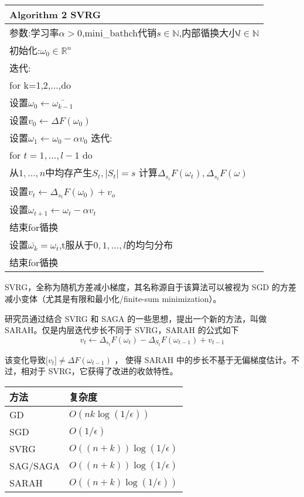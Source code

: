 \documentclass{book}
\begin{document}
\begin{tabular}{l}
	\hline
	Algorithm 2 SVRG\\
	\hline
	参数:学习率$\alpha>0$,mini\_bathch代销$s\in\mathbb{N}$,内部循换大小$l\in\mathbb{N}$\\
	初始化:$\omega_0\in\mathbb{R}^n$\\
	迭代:\\
	for k=1,2,$\ldots$,do\\
	    设置$\omega_0\leftarrow\bar{\omega_{k-1}}$\\
	    设置$v_0\leftarrow\Delta F(\omega_0)$\\
	    设置$\omega_1\leftarrow\omega_0-\alpha v_0$
	    迭代:\\
	    for $t=1,\ldots,l-1$ do\\
	   	 从${1,\ldots,n}$中均存产生$S_t,|S_t|=s$
	        计算$\Delta_{s_i}F(\omega_t),\Delta_{s_t}F(\omega)$\\
	        设置$v_t\leftarrow \Delta_{s_t}F(\omega_0)+v_o$\\
  	        设置$\omega_{t+1}\leftarrow\omega_t-\alpha v_t$\\
            结束for循换\\
	设置$\bar{\omega_k}=\omega_t$,t服从于{$0,1,\ldots,l$}的均匀分布\\
	结束for循换\\
	\hline
\end{tabular}


SVRG，全称为随机方差减小梯度，其名称源自于该算法可以被视为 SGD 的方差减小变体（尤其是有限和最小化/finite-sum minimization）。

研究员通过结合 SVRG 和 SAGA 的一些思想，提出一个新的方法，叫做 SARAH。仅是内层迭代步长不同于 SVRG，SARAH 的公式如下
\begin{equation}\label{eq:optimizer8}
	v_t\leftarrow\Delta_{s_t}F(\omega_t)-\Delta_{S_t}F(\omega_{t-1})+v_{t-1}
\end{equation}


该变化导致$\mathbb[v_t]\neq\Delta F(\omega_{t-1})$ ，
使得 SARAH 中的步长不基于无偏梯度估计。不过，相对于 SVRG，它获得了改进的收敛特性。

\begin{tabular}{ll}\label{最小强化凸函数一阶方法计算复杂度}
	方法&复杂度\\
	\hline
	GD&$O(nk\log(1/\epsilon))$\\
	SGD&$O(1/\epsilon)$\\
	SVRG&$O((n+k))\log(1/\epsilon)$\\
	SAG/SAGA&$O((n+k))\log(1/\epsilon)$\\
	SARAH&$O((n+k)\log(1/\epsilon))$
\end{tabular}
\end{document}
